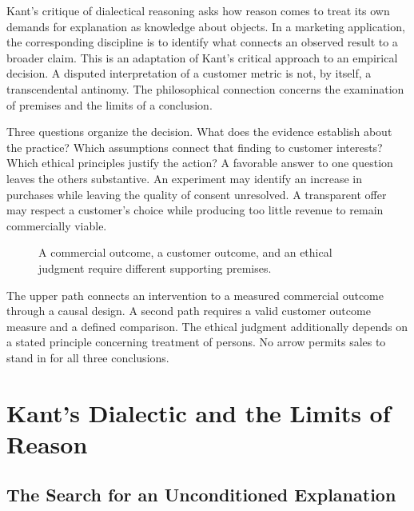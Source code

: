 Kant's critique of dialectical reasoning asks how reason comes to treat
its own demands for explanation as knowledge about objects. In a
marketing application, the corresponding discipline is to identify what
connects an observed result to a broader claim. This is an adaptation of
Kant's critical approach to an empirical decision. A disputed
interpretation of a customer metric is not, by itself, a transcendental
antinomy. The philosophical connection concerns the examination of
premises and the limits of a conclusion.

Three questions organize the decision. What does the evidence establish
about the practice? Which assumptions connect that finding to customer
interests? Which ethical principles justify the action? A favorable
answer to one question leaves the others substantive. An experiment may
identify an increase in purchases while leaving the quality of consent
unresolved. A transparent offer may respect a customer's choice while
producing too little revenue to remain commercially viable.

\begin{figure}[htbp]
\centering

\caption{A commercial outcome, a customer outcome, and an ethical judgment require different supporting premises.}\label{fig:M09_claim_scope}
\end{figure}

The upper path connects an intervention to a measured commercial outcome
through a causal design. A second path requires a valid customer outcome
measure and a defined comparison. The ethical judgment additionally
depends on a stated principle concerning treatment of persons. No arrow
permits sales to stand in for all three conclusions.


\hypertarget{M09-kants-dialectic-and-the-limits-of-reason}{%
\section{Kant's Dialectic and the Limits of
Reason}\label{M09-kants-dialectic-and-the-limits-of-reason}}

\noindent \hypertarget{M09-the-search-for-an-unconditioned-explanation}{%
\subsection{The Search for an Unconditioned
Explanation}\label{M09-the-search-for-an-unconditioned-explanation}}

